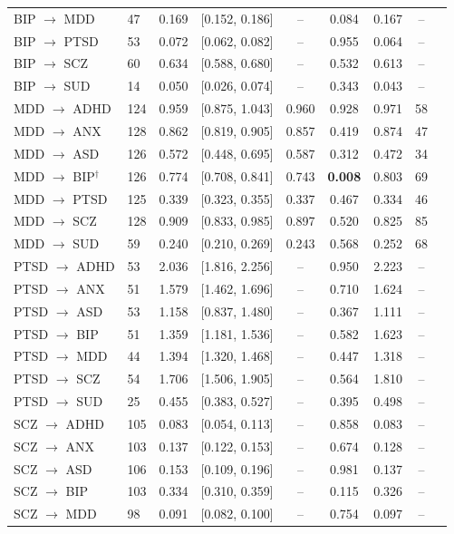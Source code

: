 \documentclass{article}
\begin{document}
\begin{table}[h]
\begin{tabular}{llccccccc}
BIP $\to$ MDD & 47 & 0.169 & [0.152, 0.186] & -- & 0.084 & 0.167 & -- \\
BIP $\to$ PTSD & 53 & 0.072 & [0.062, 0.082] & -- & 0.955 & 0.064 & -- \\
BIP $\to$ SCZ & 60 & 0.634 & [0.588, 0.680] & -- & 0.532 & 0.613 & -- \\
BIP $\to$ SUD & 14 & 0.050 & [0.026, 0.074] & -- & 0.343 & 0.043 & -- \\
\midrule
MDD $\to$ ADHD & 124 & 0.959 & [0.875, 1.043] & 0.960 & 0.928 & 0.971 & 58 \\
MDD $\to$ ANX & 128 & 0.862 & [0.819, 0.905] & 0.857 & 0.419 & 0.874 & 47 \\
MDD $\to$ ASD & 126 & 0.572 & [0.448, 0.695] & 0.587 & 0.312 & 0.472 & 34 \\
MDD $\to$ BIP$^{\dagger}$ & 126 & 0.774 & [0.708, 0.841] & 0.743 & \textbf{0.008} & 0.803 & 69 \\
MDD $\to$ PTSD & 125 & 0.339 & [0.323, 0.355] & 0.337 & 0.467 & 0.334 & 46 \\
MDD $\to$ SCZ & 128 & 0.909 & [0.833, 0.985] & 0.897 & 0.520 & 0.825 & 85 \\
MDD $\to$ SUD & 59 & 0.240 & [0.210, 0.269] & 0.243 & 0.568 & 0.252 & 68 \\
\midrule
PTSD $\to$ ADHD & 53 & 2.036 & [1.816, 2.256] & -- & 0.950 & 2.223 & -- \\
PTSD $\to$ ANX & 51 & 1.579 & [1.462, 1.696] & -- & 0.710 & 1.624 & -- \\
PTSD $\to$ ASD & 53 & 1.158 & [0.837, 1.480] & -- & 0.367 & 1.111 & -- \\
PTSD $\to$ BIP & 51 & 1.359 & [1.181, 1.536] & -- & 0.582 & 1.623 & -- \\
PTSD $\to$ MDD & 44 & 1.394 & [1.320, 1.468] & -- & 0.447 & 1.318 & -- \\
PTSD $\to$ SCZ & 54 & 1.706 & [1.506, 1.905] & -- & 0.564 & 1.810 & -- \\
PTSD $\to$ SUD & 25 & 0.455 & [0.383, 0.527] & -- & 0.395 & 0.498 & -- \\
\midrule
SCZ $\to$ ADHD & 105 & 0.083 & [0.054, 0.113] & -- & 0.858 & 0.083 & -- \\
SCZ $\to$ ANX & 103 & 0.137 & [0.122, 0.153] & -- & 0.674 & 0.128 & -- \\
SCZ $\to$ ASD & 106 & 0.153 & [0.109, 0.196] & -- & 0.981 & 0.137 & -- \\
SCZ $\to$ BIP & 103 & 0.334 & [0.310, 0.359] & -- & 0.115 & 0.326 & -- \\
SCZ $\to$ MDD & 98 & 0.091 & [0.082, 0.100] & -- & 0.754 & 0.097 & -- \\

\end{tabular}
\end{table}
\end{document}
